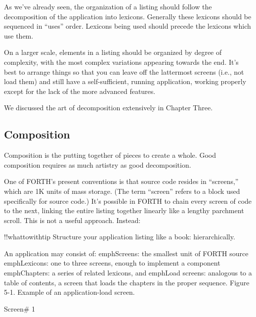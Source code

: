 As we've already seen, the organization of a listing should follow the
decomposition of the application into lexicons.  Generally these lexicons
should be sequenced in ``uses'' order.  Lexicons being used should precede
the lexicons which use them.

On a larger scale, elements in a listing should be organized by
degree of complexity, with the most complex variations appearing
towards the end.  It's best to arrange things so that you can leave off the
lattermost screens (i.e., not load them) and still have a self-sufficient,
running application, working properly except for the lack of the more advanced
features.

We discussed the art of decomposition extensively in Chapter Three.

\subsection{Composition}

Composition is the putting together of pieces to create a whole.  Good
composition requires as much artistry as good decomposition.

One of FORTH's present conventions is that source code resides in
``screens,'' which are 1K units of mass storage.  (The term ``screen'' refers
to a block used specifically for source code.) It's possible in FORTH to
chain every screen of code to the next, linking the entire listing together
linearly like a lengthy parchment scroll.  This is not a useful approach.
Instead:

!!whattowithtip{
Structure your application listing like a book: hierarchically.
}

An application may consist of:
emph{Screens:} the smallest unit of FORTH source
emph{Lexicons:} one to three screens, enough to implement a component
emph{Chapters:} a series of related lexicons, and
emph{Load screens:} analogous to a table of contents, a screen that loads the
chapters in the proper sequence.
Figure 5-1. Example of an application-load screen.

Screen\# 1

